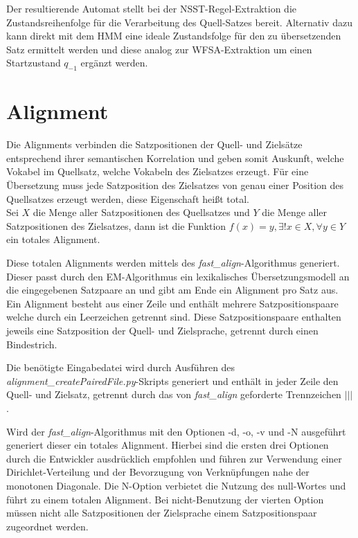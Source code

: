\documentclass[conference]{IEEEtran}
\begin{document}
Der resultierende Automat stellt bei der NSST-Regel-Extraktion die Zustandsreihenfolge für die Verarbeitung des Quell-Satzes bereit.
Alternativ dazu kann direkt mit dem HMM eine ideale Zustandsfolge für den zu übersetzenden Satz ermittelt werden und diese analog zur WFSA-Extraktion um einen Startzustand $q_{-1}$ ergänzt werden.

\section{Alignment}
Die Alignments verbinden die Satzpositionen der Quell- und Zielsätze entsprechend ihrer semantischen Korrelation und geben somit Auskunft, welche Vokabel im Quellsatz, welche Vokabeln des Zielsatzes erzeugt. 
Für eine Übersetzung muss jede Satzposition des Zielsatzes von genau einer Position des Quellsatzes erzeugt werden, diese Eigenschaft heißt total. \\
Sei $X$ die Menge aller Satzpositionen des Quellsatzes und $Y$ die Menge aller Satzpositionen des Zielsatzes, dann ist die Funktion $f(x) = y, \exists! x \in X, \forall y \in Y $ ein totales Alignment. 

Diese totalen Alignments werden mittels des \textit{fast\_align}-Algorithmus \cite{fast_align} generiert.
Dieser passt durch den EM-Algorithmus ein lexikalisches Übersetzungsmodell an die eingegebenen Satzpaare an \cite{fast_align} und gibt am Ende ein Alignment pro Satz aus.
Ein Alignment besteht aus einer Zeile und enthält mehrere Satzpositionspaare welche durch ein Leerzeichen getrennt sind.
Diese Satzpositionspaare enthalten jeweils eine Satzposition der Quell- und Zielsprache, getrennt durch einen Bindestrich.

Die benötigte Eingabedatei wird durch Ausführen des \textit{alignment\_createPairedFile.py}-Skripts generiert und enthält in jeder Zeile den Quell- und Zielsatz, getrennt durch das von \textit{fast\_align} geforderte Trennzeichen \glqq{} $ ||| $ \grqq .

Wird der \textit{fast\_align}-Algorithmus mit den Optionen -d, -o, -v und -N ausgeführt generiert dieser ein totales Alignment.
Hierbei sind die ersten drei Optionen durch die Entwickler ausdrücklich empfohlen und führen zur Verwendung einer Dirichlet-Verteilung und der Bevorzugung von Verknüpfungen nahe der monotonen Diagonale. 
Die N-Option verbietet die Nutzung des null-Wortes und führt zu einem totalen Alignment.
Bei nicht-Benutzung der vierten Option müssen nicht alle Satzpositionen der Zielsprache einem Satzpositionspaar zugeordnet werden.
\end{document}
